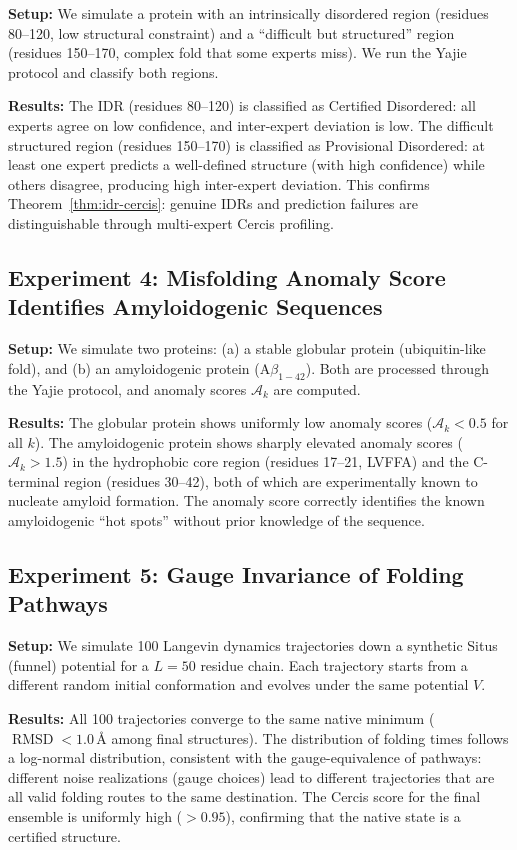 \documentclass[12pt,a4paper]{article}
\theoremstyle{remark}
\DeclareMathOperator{\RMSD}{RMSD}
\begin{document}
\textbf{Setup:} We simulate a protein with an intrinsically disordered region (residues 80--120, low structural constraint) and a ``difficult but structured'' region (residues 150--170, complex fold that some experts miss).
We run the Yajie protocol and classify both regions.

\textbf{Results:} The IDR (residues 80--120) is classified as Certified Disordered: all experts agree on low confidence, and inter-expert deviation is low.
The difficult structured region (residues 150--170) is classified as Provisional Disordered: at least one expert predicts a well-defined structure (with high confidence) while others disagree, producing high inter-expert deviation.
This confirms Theorem~\ref{thm:idr-cercis}: genuine IDRs and prediction failures are distinguishable through multi-expert Cercis profiling.

\subsection{Experiment 4: Misfolding Anomaly Score Identifies Amyloidogenic Sequences}

\textbf{Setup:} We simulate two proteins: (a) a stable globular protein (ubiquitin-like fold), and (b) an amyloidogenic protein (A$\beta_{1-42}$).
Both are processed through the Yajie protocol, and anomaly scores $\mathcal{A}_k$ are computed.

\textbf{Results:} The globular protein shows uniformly low anomaly scores ($\mathcal{A}_k < 0.5$ for all $k$).
The amyloidogenic protein shows sharply elevated anomaly scores ($\mathcal{A}_k > 1.5$) in the hydrophobic core region (residues 17--21, LVFFA) and the C-terminal region (residues 30--42), both of which are experimentally known to nucleate amyloid formation.
The anomaly score correctly identifies the known amyloidogenic ``hot spots'' without prior knowledge of the sequence.

\subsection{Experiment 5: Gauge Invariance of Folding Pathways}

\textbf{Setup:} We simulate 100 Langevin dynamics trajectories down a synthetic Situs (funnel) potential for a $L = 50$ residue chain.
Each trajectory starts from a different random initial conformation and evolves under the same potential $V$.

\textbf{Results:} All 100 trajectories converge to the same native minimum ($\RMSD < 1.0$\,\AA{} among final structures).
The distribution of folding times follows a log-normal distribution, consistent with the gauge-equivalence of pathways: different noise realizations (gauge choices) lead to different trajectories that are all valid folding routes to the same destination.
The Cercis score for the final ensemble is uniformly high ($> 0.95$), confirming that the native state is a certified structure.
\end{document}
